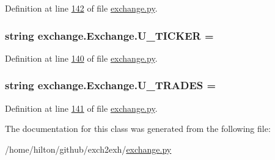 Definition at line \hyperlink{exchange_8py_source_l00142}{142} of file \hyperlink{exchange_8py_source}{exchange.\+py}.

\subsubsection[{\texorpdfstring{U\+\_\+\+T\+I\+C\+K\+ER}{U_TICKER}}]{\setlength{\rightskip}{0pt plus 5cm}string exchange.\+Exchange.\+U\+\_\+\+T\+I\+C\+K\+ER = \textquotesingle{}\textquotesingle{}\hspace{0.3cm}{\ttfamily [static]}}\hypertarget{classexchange_1_1_exchange_ab16df02480d727c533b02b5b7afa053b}{}\label{classexchange_1_1_exchange_ab16df02480d727c533b02b5b7afa053b}


Definition at line \hyperlink{exchange_8py_source_l00140}{140} of file \hyperlink{exchange_8py_source}{exchange.\+py}.

\subsubsection[{\texorpdfstring{U\+\_\+\+T\+R\+A\+D\+ES}{U_TRADES}}]{\setlength{\rightskip}{0pt plus 5cm}string exchange.\+Exchange.\+U\+\_\+\+T\+R\+A\+D\+ES = \textquotesingle{}\textquotesingle{}\hspace{0.3cm}{\ttfamily [static]}}\hypertarget{classexchange_1_1_exchange_aafa0e023de170f51cbf9d48e1154587a}{}\label{classexchange_1_1_exchange_aafa0e023de170f51cbf9d48e1154587a}


Definition at line \hyperlink{exchange_8py_source_l00141}{141} of file \hyperlink{exchange_8py_source}{exchange.\+py}.



The documentation for this class was generated from the following file\+:\begin{DoxyCompactItemize}
\item 
/home/hilton/github/exch2exh/\hyperlink{exchange_8py}{exchange.\+py}\end{DoxyCompactItemize}
